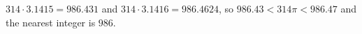 $314\cdot3.1415=986.431$ and $314\cdot3.1416=986.4624$, so $986.43<314\pi<986.47$ and the nearest integer is $\boxed{986}$.
